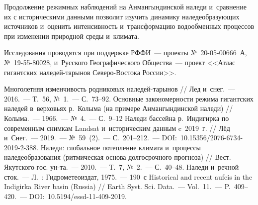 Продолжение режимных наблюдений на Анмангындинской наледи и~сравнение их с историческими данными позволит изучить динамику наледеобразующих источников и~оценить интенсивность и~трансформацию водообменных процессов при изменении природной среды и~климата.

Исследования проводятся при поддержке РФФИ~--- проекты №~20-05-00666~А, №~19-55-80028, и~Русского Географического Общества~--- проект <<Атлас гигантских наледей-тарынов Северо-Востока России>>.

\begin{thebibliography}{99}
\bibitem{} Многолетняя изменчивость родниковых наледей-тарынов // Лед и~снег.~--- 2016.~--- Т.~56, №~1.~--- С.~73--92.
\bibitem{} Основные закономерности режима гигантских наледей в~верховьях р.~Колыма (на примере Анмангындинской наледи) // Колыма.~--- 1966.~--- №~4.~--- С.~9--12
\bibitem{} Наледи бассейна р.~Индигирка по современным снимкам Landsat и~историческим данным c~2019~г. // Лёд и~Снег.~--- 2019.~--- №~59~(2).~--- С.~201--212.~--- DOI:~10.15356/2076-6734-2019-2-388.
\bibitem{} Наледи: глобальное потепление климата и~процессы наледеобразования (ритмическая основа долгосрочного прогноза) // Вест. Якутского гос. ун-та.~--- 2010.~--- Т.~7, №~2.~--- С.~40--48.
\bibitem{} Наледи и~речной сток.~--- Л.~: Гидрометеоиздат, 1975.~--- 190~с
\bibitem{} Historical and recent aufeis in the Indigirka River basin (Russia) // Earth Syst. Sci. Data.~--- Vol.~11.~--- P.~409--420.~--- DOI:~10.5194/essd-11-409-2019.
\end{thebibliography}

